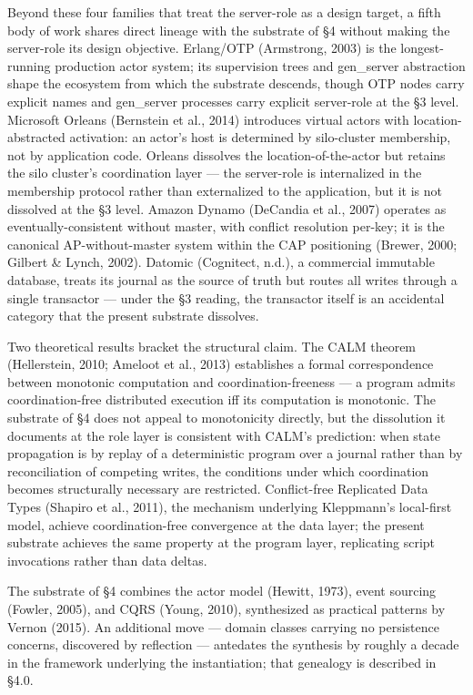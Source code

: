 \documentclass[
]{article}
\begin{document}
Beyond these four families that treat the server-role as a design
target, a fifth body of work shares direct lineage with the substrate of
§4 without making the server-role its design objective. Erlang/OTP
(Armstrong, 2003) is the longest-running production actor system; its
supervision trees and gen\_server abstraction shape the ecosystem from
which the substrate descends, though OTP nodes carry explicit names and
gen\_server processes carry explicit server-role at the §3 level.
Microsoft Orleans (Bernstein et al., 2014) introduces virtual actors
with location-abstracted activation: an actor's host is determined by
silo-cluster membership, not by application code. Orleans dissolves the
location-of-the-actor but retains the silo cluster's coordination layer
--- the server-role is internalized in the membership protocol rather
than externalized to the application, but it is not dissolved at the §3
level. Amazon Dynamo (DeCandia et al., 2007) operates as
eventually-consistent without master, with conflict resolution per-key;
it is the canonical AP-without-master system within the CAP positioning
(Brewer, 2000; Gilbert \& Lynch, 2002). Datomic (Cognitect, n.d.), a
commercial immutable database, treats its journal as the source of truth
but routes all writes through a single transactor --- under the §3
reading, the transactor itself is an accidental category that the
present substrate dissolves.

Two theoretical results bracket the structural claim. The CALM theorem
(Hellerstein, 2010; Ameloot et al., 2013) establishes a formal
correspondence between monotonic computation and coordination-freeness
--- a program admits coordination-free distributed execution iff its
computation is monotonic. The substrate of §4 does not appeal to
monotonicity directly, but the dissolution it documents at the role
layer is consistent with CALM's prediction: when state propagation is by
replay of a deterministic program over a journal rather than by
reconciliation of competing writes, the conditions under which
coordination becomes structurally necessary are restricted.
Conflict-free Replicated Data Types (Shapiro et al., 2011), the
mechanism underlying Kleppmann's local-first model, achieve
coordination-free convergence at the data layer; the present substrate
achieves the same property at the program layer, replicating script
invocations rather than data deltas.

The substrate of §4 combines the actor model (Hewitt, 1973), event
sourcing (Fowler, 2005), and CQRS (Young, 2010), synthesized as
practical patterns by Vernon (2015). An additional move --- domain
classes carrying no persistence concerns, discovered by reflection ---
antedates the synthesis by roughly a decade in the framework underlying
the instantiation; that genealogy is described in §4.0.
\end{document}
